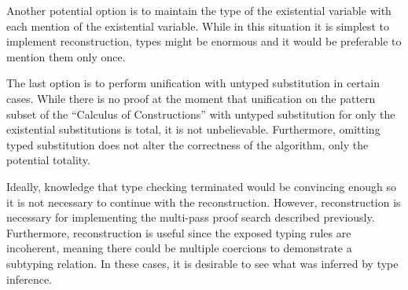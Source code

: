 Another potential option is to maintain the type of the existential variable 
with each mention of the existential variable.  
While in this situation it is simplest to implement reconstruction, 
types might be enormous and it would be preferable to mention them only once.  

The last option is to perform unification with untyped substitution in certain cases.  
While there is no proof at the moment that unification on the pattern subset of 
the ``Calculus of Constructions'' with untyped substitution for only the existential substitutions
is total, it is not unbelievable.  Furthermore, omitting typed substitution does not alter
the correctness of the algorithm, only the potential totality.  

Ideally, knowledge that type checking terminated would be convincing enough
so it is not necessary to continue with the reconstruction.  However, reconstruction
is necessary for implementing the multi-pass proof search described previously.  
Furthermore, reconstruction is useful since the exposed typing rules are incoherent, 
meaning there could be multiple coercions to demonstrate a subtyping relation.  In these cases, it is desirable to see what was inferred by type inference.
